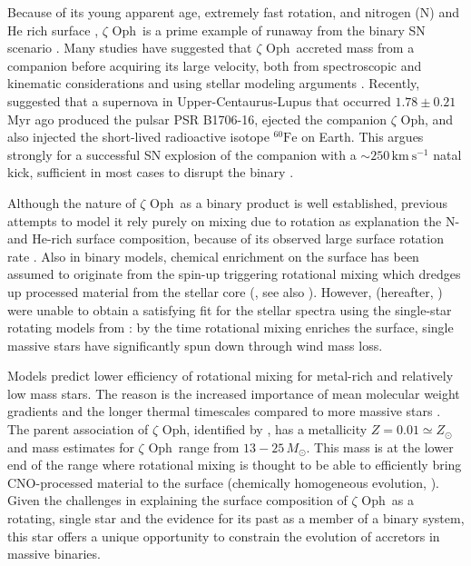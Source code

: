 \documentclass[twocolumn,twocolappendix,trackchanges]{aastex63}
\newcommand{\kms}{{\mathrm{km\ s^{-1}}}}
\newcommand{\zoph}{$\zeta$ Oph}
\begin{document}
Because of its young apparent age, extremely fast rotation, and
nitrogen (N) and He rich surface \citep[e.g.,][]{herrero:92,
  blaauw:93, villamariz:05, marcolino:09}, \zoph\ is a prime example
of runaway from the binary SN scenario \citep{blaauw:93}. Many studies
have suggested that \zoph\ accreted mass from a companion before
acquiring its large velocity, both from spectroscopic and kinematic
considerations \citep[e.g.,][]{blaauw:93, hoogerwerf:00,
  hoogerwerf:01, tetzlaff:10, neuhauser:20} and using stellar modeling
arguments \citep[e.g.,][]{vanrensbergen:96}. Recently,
\cite{neuhauser:20} suggested that a supernova in
Upper-Centaurus-Lupus that occurred $1.78\pm0.21$\,Myr ago produced the pulsar PSR B1706-16, ejected the companion \zoph,
and also injected the short-lived radioactive isotope
$^{60}\mathrm{Fe}$ on Earth. This argues strongly for a successful SN
explosion of the companion with a $\sim 250\,\kms$ natal kick,
sufficient in most cases to disrupt the binary
\citep[e.g.,][]{tauris:15, renzo:19walk, evans:20}.

Although the nature of \zoph\ as a binary product is well established, previous attempts
to model it rely purely on mixing due to rotation as explanation the N- and
He-rich surface composition, because of its observed large surface rotation rate \cite[e.g.,][]{maeder:00}. Also in binary models, chemical enrichment on the surface has been assumed to originate from the spin-up triggering rotational mixing which dredges up processed material from the stellar core (\citealt{vanrensbergen:96}, see also \citealt{cantiello:07}). However, \cite{villamariz:05}
(hereafter, ) were unable to obtain a satisfying fit
for the stellar spectra using the single-star rotating models from
\cite{meynet:00, meynet:03}: by the time rotational mixing enriches
the surface, single massive stars have significantly spun down through
wind mass loss.

Models predict lower efficiency of rotational mixing for
metal-rich and relatively low mass stars. The reason is the increased
importance of mean molecular weight gradients and the longer thermal
timescales compared to more massive stars \citep[e.g.,][]{yoon:06,
  perna:14}. The parent association of \zoph, identified by
\cite{neuhauser:20}, has a metallicity $Z=0.01\simeq Z_\odot$
\citep[based on asteroseismology from][]{murphy:21} and mass estimates
for \zoph\ range from $13-25\,M_\odot$. This mass is at the lower end
of the range where rotational mixing is thought to be able to
efficiently bring CNO-processed material to the surface (chemically
homogeneous evolution, \citealt{maeder:00}).
Given the challenges in explaining the surface composition of \zoph\
as a rotating, single star and the evidence for its past as a member of
a binary system, this star offers a unique opportunity to constrain
the evolution of accretors in massive binaries.
\end{document}
